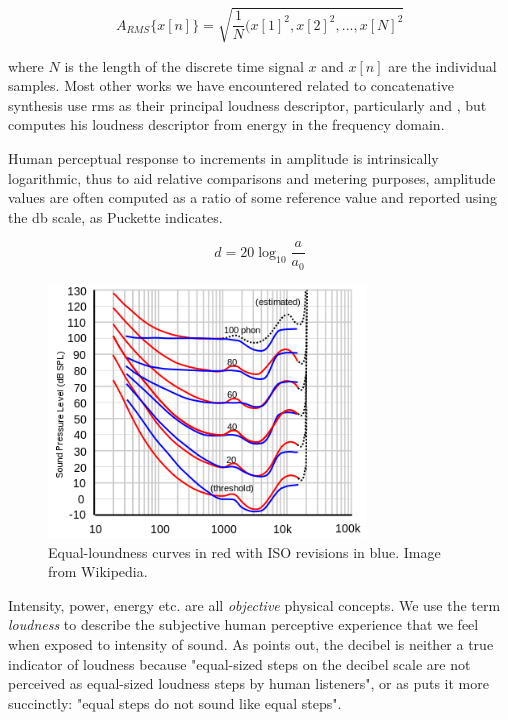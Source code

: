 {{\begin{equation}
\label{eq:rms}	
A_{RMS}\{x[n]\} = \sqrt{\frac{1}{N}(x[1]^2, x[2]^2,..., x[N]^2}
\end{equation}

where $N$ is the length of the discrete time signal $x$ and $x[n]$ are the individual samples. Most other works we have encountered related to concatenative synthesis use \acrshort{rms} as their principal loudness descriptor, particularly \cite{Sturm2004} and \cite{Bernardes2013}, but \cite{Jehan2005} computes his loudness descriptor from energy in the frequency domain.

Human perceptual response to increments in amplitude is intrinsically logarithmic, thus to aid relative comparisons and metering purposes, amplitude values are often computed as a ratio of some reference value and reported using the \acrfull{db} scale, as Puckette \citeyearpar{Puckette2006} indicates. 

\begin{equation}
\label{eq:decibel}	
d = 20\log_{10}{\frac{a}{a_{0}}}
\end{equation}

\begin{figure}
	\begin{center}
		\includegraphics[width=0.75\textwidth]{ch05_pyconcat/figures/fletcher_munson.png}
	\end{center}
	\caption[Fletcher-Munson curves]{Equal-loundness curves in red with ISO revisions in blue. Image from Wikipedia.}
	\label{fig:fletcher}
\end{figure}

Intensity, power, energy etc. are all \textit{objective} physical concepts. We use the term \textit{loudness} to describe the subjective human perceptive experience that we feel when exposed to intensity of sound. As \cite{Lerch2012} points out, the decibel is neither a true indicator of loudness because "equal-sized steps on the decibel scale are not perceived as equal-sized loudness steps by human listeners", or as \cite{Stevens1955} puts it more succinctly: "equal steps do not sound like equal steps".

}}
